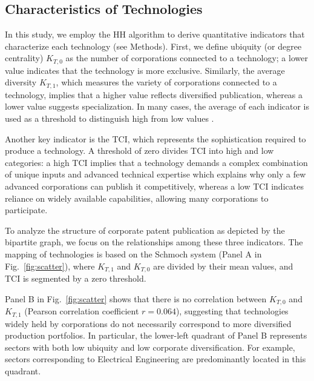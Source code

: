 \subsection*{Characteristics of Technologies} 
{}
\label{subsection:characteristics}

In this study, we employ the HH algorithm to derive quantitative indicators that characterize each technology (see Methods). 
First, we define ubiquity (or degree centrality) $K_{T,0}$ as the number of corporations connected to a technology; a lower value indicates that the technology is more exclusive. Similarly, the average diversity $K_{T,1}$, which measures the variety of corporations connected to a technology, implies that a higher value reflects diversified publication, whereas a lower value suggests specialization. In many cases, the average of each indicator is used as a threshold to distinguish high from low values \cite{Hidalgo2009,balland2017tci}.

Another key indicator is the TCI, which represents the sophistication required to produce a technology. A threshold of zero divides TCI into high and low categories: a high TCI implies that a technology demands a complex combination of unique inputs and advanced technical expertise which explains why only a few advanced corporations can publish it competitively, whereas a low TCI indicates reliance on widely available capabilities, allowing many corporations to participate.

To analyze the structure of corporate patent publication as depicted by the bipartite graph, we focus on the relationships among these three indicators. The mapping of technologies is based on the Schmoch system \cite{Schmoch2008} (Panel A in Fig.~\ref{fig:scatter}), where $K_{T,1}$ and $K_{T,0}$ are divided by their mean values, and TCI is segmented by a zero threshold.

Panel B in Fig.~\ref{fig:scatter} shows that there is no correlation between $K_{T,0}$ and $K_{T,1}$ (Pearson correlation coefficient $r=0.064$), suggesting that technologies widely held by corporations do not necessarily correspond to more diversified production portfolios. 
In particular, the lower-left quadrant of Panel B represents sectors with both low ubiquity and low corporate diversification. For example, sectors corresponding to Electrical Engineering are predominantly located in this quadrant.

